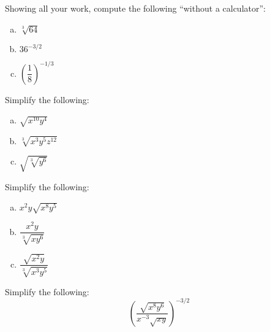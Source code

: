 \documentclass[11pt,letterpaper]{article}
\begin{document}

 Showing all your work, compute the following ``without a calculator'': 
	\begin{enumerate}[(a)]
	\item $\sqrt[3]{64}$
	\item $36^{-3/2}$
	\item $\left( \dfrac{1}{8} \right)^{-1/3}$
	\end{enumerate}   



\newpage



 Simplify the following:
	\begin{enumerate}[(a)]
	\item $\sqrt{x^{10} y^4}$
	\item $\sqrt[3]{x^3 y^5 z^{12}}$
	\item $\sqrt{\sqrt[3]{y^6}}$
	\end{enumerate}   	



\newpage



 Simplify the following:
	\begin{enumerate}[(a)]
	\item $x^2 y \sqrt{x^8 y^5}$
	\item $\dfrac{x^2 y}{\sqrt[3]{x y^6}}$
	\item $\dfrac{\sqrt{x^2 y}}{\sqrt[3]{x^3 y^5}}$
	\end{enumerate}   



\newpage



 Simplify the following:
	\[
	\left( \dfrac{\sqrt{x^8 y^6}}{x^{-3} \sqrt{x y}} \right)^{-3/2}
	\]
\end{document}
